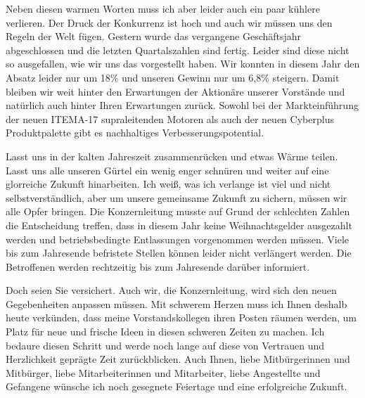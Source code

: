 Neben diesen warmen Worten muss ich aber leider auch ein paar kühlere
verlieren. Der Druck der Konkurrenz ist hoch und auch wir müssen uns den
Regeln der Welt fügen. Gestern wurde das vergangene Geschäftsjahr
abgeschlossen und die letzten Quartalszahlen sind fertig. Leider sind
diese nicht so ausgefallen, wie wir uns das vorgestellt haben.
Wir konnten in diesem Jahr den Absatz leider nur um 18\% und unseren
Gewinn nur um 6,8\% steigern. Damit bleiben wir weit hinter den
Erwartungen der Aktionäre unserer Vorstände und natürlich auch hinter
Ihren Erwartungen zurück.
Sowohl bei der Markteinführung der neuen ITEMA-17 supraleitenden Motoren
als auch der neuen Cyberplus Produktpalette gibt es nachhaltiges Verbesserungspotential.

Lasst uns in der kalten Jahreszeit zusammenrücken und etwas Wärme
teilen. Lasst uns alle unseren Gürtel ein wenig enger schnüren und weiter auf
eine glorreiche Zukunft hinarbeiten. Ich weiß, was ich verlange ist
viel und nicht selbstverständlich, aber um unsere gemeinsame Zukunft zu
sichern, müssen wir alle Opfer bringen. Die Konzernleitung musste auf
Grund der schlechten Zahlen die Entscheidung treffen, dass in diesem
Jahr keine Weihnachtsgelder ausgezahlt werden und betriebsbedingte Entlassungen 
vorgenommen werden müssen. Viele bis zum Jahresende befristete Stellen können leider nicht verlängert werden.
Die Betroffenen werden rechtzeitig bis zum Jahresende darüber informiert.

Doch seien Sie versichert. Auch wir, die Konzernleitung, wird sich den
neuen Gegebenheiten anpassen müssen.
Mit schwerem Herzen muss ich Ihnen deshalb heute verkünden, dass meine Vorstandskollegen ihren Posten räumen werden, um
Platz für neue und frische Ideen in diesen schweren Zeiten zu machen.
Ich bedaure diesen Schritt und werde noch lange auf diese von Vertrauen
und Herzlichkeit geprägte Zeit zurückblicken.
Auch Ihnen, liebe Mitbürgerinnen und Mitbürger, liebe Mitarbeiterinnen
und Mitarbeiter, liebe Angestellte und Gefangene wünsche ich noch
gesegnete Feiertage und eine erfolgreiche Zukunft.

\impressumStandalone

%
%


